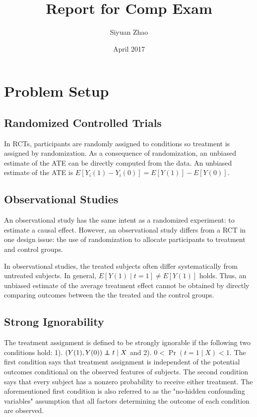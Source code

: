 \documentclass{article}
\title{Report for Comp Exam}
\author{Siyuan Zhao}
\date{April 2017}
\newcommand\independent{\protect\mathpalette{\protect\independenT}{\perp}}
\def\independenT#1#2{\mathrel{\rlap{$#1#2$}\mkern2mu{#1#2}}}
\begin{document}
\maketitle
\section{Problem Setup}
\subsection{Randomized Controlled Trials}
In RCTs, participants are randomly assigned to conditions so treatment is assigned by randomization. As a consequence of
randomization, an unbiased estimate of the ATE can be directly
computed from the data. An unbiased estimate of the ATE is
$E[Y_i(1)-Y_i(0)]=E[Y(1)] - E[Y(0)]$.

\subsection{Observational Studies}
An observational study has the same intent as a randomized experiment:
to estimate a causal effect. However, an observational study differs
from a RCT in one design issue: the use of randomization to allocate
participants to treatment and control groups.

In observational studies, the treated subjects often differ
systematically from untreated subjects. In general, $E[Y(1)\mid t=1]
\neq E[Y(1)]$ holds. Thus, an unbiased estimate of the average
treatment effect cannot be obtained by directly comparing outcomes
between the the treated and the control groups.

\subsection{Strong Ignorability}
The treatment assignment is defined to be strongly ignorable
\cite{rosenbaum1983central} if the following two conditions hold: 1).
$(Y(1), Y(0)) \independent t\mid X$ and 2). $0 < \Pr (t=1 \mid X) <
1$. The first condition says that treatment assignment is independent
of the potential outcomes conditional on the observed features of subjects. The second condition says that every subject has a nonzero
probability to receive either treatment. The aforementioned first
condition is also referred to as the "no-hidden confounding variables"
assumption that all factors determining the outcome of each condition
are observed.
\end{document}
